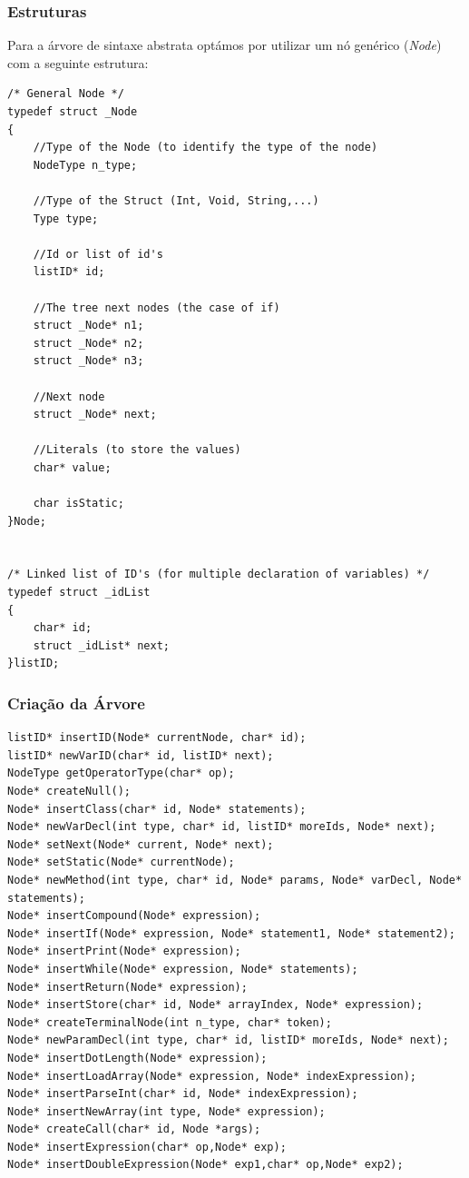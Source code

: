 \documentclass[12pt]{article}
\begin{document}
\subsubsection{Estruturas}
Para a árvore de sintaxe abstrata optámos por utilizar um nó genérico (\emph{Node}) com a  seguinte estrutura: 

\begin{lstlisting}
/* General Node */
typedef struct _Node
{
    //Type of the Node (to identify the type of the node)
	NodeType n_type;

    //Type of the Struct (Int, Void, String,...)
	Type type;

    //Id or list of id's
    listID* id;

    //The tree next nodes (the case of if)
    struct _Node* n1;
    struct _Node* n2;
    struct _Node* n3;

    //Next node
    struct _Node* next;

    //Literals (to store the values)
    char* value;

    char isStatic;
}Node;


/* Linked list of ID's (for multiple declaration of variables) */
typedef struct _idList
{
	char* id;
	struct _idList* next;
}listID;

\end{lstlisting}
 
 \subsubsection{Criação da Árvore}
\begin{lstlisting}
listID* insertID(Node* currentNode, char* id);
listID* newVarID(char* id, listID* next);
NodeType getOperatorType(char* op);
Node* createNull();
Node* insertClass(char* id, Node* statements);
Node* newVarDecl(int type, char* id, listID* moreIds, Node* next);
Node* setNext(Node* current, Node* next);
Node* setStatic(Node* currentNode);
Node* newMethod(int type, char* id, Node* params, Node* varDecl, Node* statements);
Node* insertCompound(Node* expression);
Node* insertIf(Node* expression, Node* statement1, Node* statement2);
Node* insertPrint(Node* expression);
Node* insertWhile(Node* expression, Node* statements);
Node* insertReturn(Node* expression);
Node* insertStore(char* id, Node* arrayIndex, Node* expression);
Node* createTerminalNode(int n_type, char* token);
Node* newParamDecl(int type, char* id, listID* moreIds, Node* next);
Node* insertDotLength(Node* expression);
Node* insertLoadArray(Node* expression, Node* indexExpression);
Node* insertParseInt(char* id, Node* indexExpression);
Node* insertNewArray(int type, Node* expression);
Node* createCall(char* id, Node *args);
Node* insertExpression(char* op,Node* exp);
Node* insertDoubleExpression(Node* exp1,char* op,Node* exp2);
 \end{lstlisting}
\end{document}
